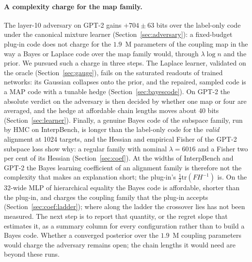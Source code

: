 \documentclass[11pt,a4paper]{article}
\begin{document}
\paragraph{A complexity charge for the map family.} The layer-10 adversary on GPT-2 gains $+704\pm63$ bits over the label-only code under the canonical mixture learner (Section~\ref{sec:adversary}): a fixed-budget plug-in code does not charge for the $1.9$~M parameters of the coupling map in the way a Bayes or Laplace code over the map family would, through $\lambda\log n$ and the prior. We pursued such a charge in three steps. The Laplace learner, validated on the oracle (Section~\ref{sec:gauge}), fails on the saturated readouts of trained networks: its Gaussian collapses onto the prior, and the repaired, sampled code is a MAP code with a tunable hedge (Section~\ref{sec:bayescode}). On GPT-2 the absolute verdict on the adversary is then decided by whether one map or four are averaged, and the hedge at affordable chain lengths moves about 40 bits (Section~\ref{sec:learner}). Finally, a genuine Bayes code of the subspace family, run by HMC on InterpBench, is longer than the label-only code for the \emph{valid} alignment at 1024 targets, and the Hessian and empirical Fisher of the GPT-2 subspace loss show why: a regular family with nominal $\lambda=6016$ and a Fisher two per cent of its Hessian (Section~\ref{sec:coef}). At the widths of InterpBench and GPT-2 the Bayes learning coefficient of an alignment family is therefore not the complexity that makes an explanation short; the plug-in's $\tfrac12\mathrm{tr}(FH^{-1})$ is. On the 32-wide MLP of hierarchical equality the Bayes code is affordable, shorter than the plug-in, and charges the coupling family that the plug-in accepts (Section~\ref{sec:coef:ladder}); where along the ladder the crossover lies has not been measured. The next step is to report that quantity, or the regret slope that estimates it, as a summary column for every configuration rather than to build a Bayes code. Whether a converged posterior over the $1.9$~M coupling parameters would charge the adversary remains open; the chain lengths it would need are beyond these runs.
\end{document}

